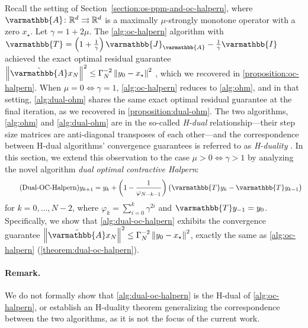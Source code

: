 \documentclass{article}
\theoremstyle{definition}
\theoremstyle{plain}
\newcommand{\reals}{\mathbb{R}}
\newcommand{\opA}{{\varmathbb{A}}}
\newcommand{\opI}{{\varmathbb{I}}}
\newcommand{\opJ}{{\varmathbb{J}}}
\newcommand{\opT}{{\varmathbb{T}}}
\newcommand{\sqnorm}[1]{\left\| #1 \right\|^2}
\newcommand{\topa}{\tilde{\opA}}
\newcommand{\pr}[1]{\left( #1 \right)}
\newcommand{\dualoc}{Dual-OC-Halpern}
\begin{document}
Recall the setting of Section~\ref{section:os-ppm-and-oc-halpern}, where $\opA\colon \reals^d \rightrightarrows \reals^d$ is a maximally $\mu$-strongly monotone operator with a zero $x_\star$.
Let $\gamma = 1+2\mu$.
The \ref{alg:oc-halpern} algorithm with $\opT = \left(1 + \frac{1}{\gamma}\right) \opJ_\opA - \frac{1}{\gamma} \opI$ achieved the exact optimal residual guarantee 
\(\sqnorm{\topa x_N}\le \Gamma_N^{-2}\sqnorm{y_0-x_\star}\) \citep{ParkRyu2022_exact}, which we recovered in \cref{proposition:oc-halpern}.
When $\mu=0 \iff \gamma=1$, \ref{alg:oc-halpern} reduces to \ref{alg:ohm}, and in that setting, \ref{alg:dual-ohm} shares the same exact optimal residual guarantee at the final iteration, as we recovered in \cref{proposition:dual-ohm}.
The two algorithms, \ref{alg:ohm} and \ref{alg:dual-ohm} are in the so-called \emph{H-dual} relationship---their step size matrices are anti-diagonal transposes of each other---and 
the correspondence between H-dual algorithms' convergence guarantees is referred to as \emph{H-duality} \citep{KimOzdaglarParkRyu2023_timereversed,YoonKimSuhRyu2024_optimal}.
In this section, we extend this observation to the case $\mu>0 \iff \gamma>1$ by analyzing the novel algorithm \emph{dual optimal contractive Halpern}:
\begin{equation}   \label{alg:dual-oc-halpern}  \tag{\dualoc}
    y_{k+1} = y_k + \pr{1 - \frac{1}{\varphi_{N-k-1}} }\bigl(\opT y_k - \opT y_{k-1}\bigr)
\end{equation}
for $k=0,\dots,N-2$, where $\varphi_k = \sum_{i=0}^{k} \gamma^{2i}$ and $\opT y_{-1} = y_0$. 
Specifically, we show that \ref{alg:dual-oc-halpern} exhibits the convergence guarantee $\sqnorm{\topa x_N}\le \Gamma_N^{-2}\sqnorm{y_0-x_\star}$,
exactly the same as \ref{alg:oc-halpern} (\cref{theorem:dual-oc-halpern}).

\paragraph{Remark.}
We do not formally show that \ref{alg:dual-oc-halpern} is the H-dual of \ref{alg:oc-halpern}, or establish an H-duality theorem generalizing the correspondence between the two algorithms, 
as it is not the focus of the current work.\bigskip
\end{document}
